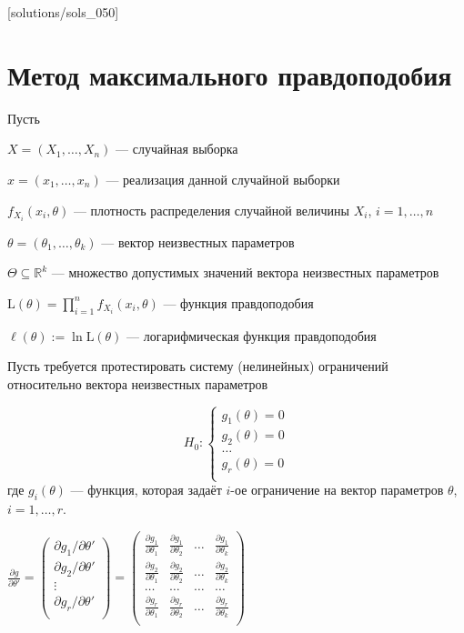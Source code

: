 [solutions/sols_050]

\chapter{Метод максимального правдоподобия} %


Пусть

$X = (X_1, \ldots, X_n)$ — случайная выборка

$x = (x_1, \ldots, x_n)$ — реализация данной случайной выборки

$f_{X_i}(x_i, \theta)$ — плотность распределения случайной величины $X_i$, $i = 1,\ldots, n$

$\theta = (\theta_1, \ldots, \theta_k)$ — вектор неизвестных параметров

$\Theta \subseteq \mathbb{R}^k$ — множество допустимых значений вектора неизвестных параметров

$\text{L}(\theta) = \prod_{i=1}^n f_{X_i}(x_i, \theta)$ — функция правдоподобия

$\ell(\theta) := \ln \text{L}(\theta)$ — логарифмическая функция правдоподобия

Пусть требуется протестировать систему (нелинейных) ограничений относительно вектора неизвестных параметров

\[
H_0: \begin{cases}
g_1(\theta) = 0 \\
g_2(\theta) = 0 \\
\ldots \\
g_r(\theta) = 0 \\
\end{cases}
\]
где $g_i(\theta)$ — функция, которая задаёт $i$-ое ограничение на вектор параметров $\theta$, $i = 1,\ldots, r$.

$\frac{\partial g}{\partial \theta'} = \begin{pmatrix}
\partial g_1/\partial \theta' \\
\partial g_2/\partial \theta' \\
\vdots \\
\partial g_r/\partial \theta' \\
\end{pmatrix} = \begin{pmatrix}
\frac{\partial g_1}{\partial \theta_1} & \frac{\partial g_1}{\partial \theta_2} & \ldots & \frac{\partial g_1}{\partial \theta_k}\\
\frac{\partial g_2}{\partial \theta_1} & \frac{\partial g_2}{\partial \theta_2} & \ldots & \frac{\partial g_2}{\partial \theta_k}\\
\ldots & \ldots & \ldots & \ldots \\
\frac{\partial g_r}{\partial \theta_1} & \frac{\partial g_r}{\partial \theta_2} & \ldots & \frac{\partial g_r}{\partial \theta_k}\\
\end{pmatrix}$

